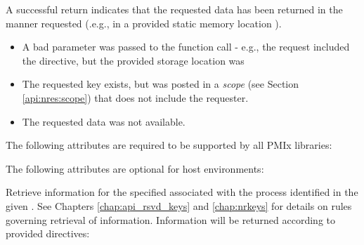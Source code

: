\begin{arglist}
\end{arglist}

A successful return indicates that the requested data has been returned in the manner requested (.e.g., in a provided static memory location ).

\returnstart
\begin{itemize}
\item {} A bad parameter was passed to the function call - e.g., the request included the  directive, but the provided storage location was 
\item {} The requested key exists, but was posted in a \emph{scope} (see Section \ref{api:nres:scope}) that does not include the requester.
\item {} The requested data was not available.
\end{itemize}
\returnend

\reqattrstart
The following attributes are required to be supported by all \ac{PMIx} libraries:


\reqattrend

\optattrstart
The following attributes are optional for host environments:


\optattrend

\descr

Retrieve information for the specified  associated with the process identified in the given . See Chapters \ref{chap:api_rsvd_keys} and \ref{chap:nrkeys} for details on rules governing retrieval of information. Information will be returned according to provided directives:

